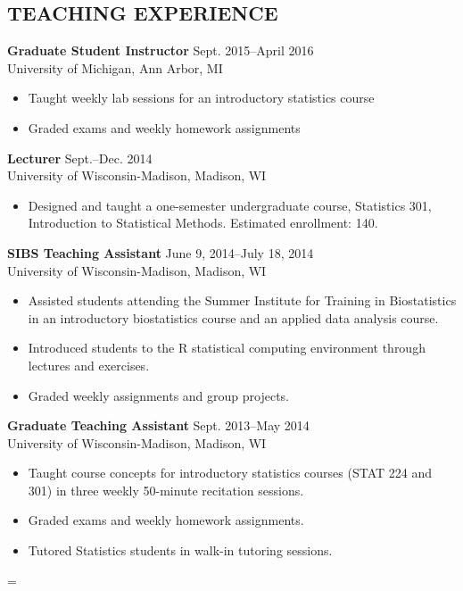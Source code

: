 \documentclass[line]{res}
\newenvironment{absolutelynopagebreak}
  {\par\nobreak\vfil\penalty0\vfilneg
   \vtop\bgroup}
  {\par\xdef\tpd{\the\prevdepth}\egroup
   \prevdepth=\tpd}
\begin{document}
\begin{resume}
\section{TEACHING EXPERIENCE}
{\bf Graduate Student Instructor} \hfill Sept. 2015--April 2016\\
University of Michigan, Ann Arbor, MI
\begin{itemize}
\item Taught weekly lab sessions for an introductory statistics course
\item Graded exams and weekly homework assignments 
\end{itemize}
{\bf Lecturer} \hfill Sept.--Dec. 2014 \\
University of Wisconsin-Madison, Madison, WI
\begin{itemize}  %
\item Designed and taught a one-semester
  undergraduate course, Statistics 301, Introduction
  to Statistical Methods. Estimated enrollment: 140. 
\end{itemize}
{\bf SIBS Teaching Assistant}  \hfill June 9,
2014--July 18, 2014\\
University of Wisconsin-Madison, Madison, WI
\begin{itemize}
\item Assisted students attending the Summer Institute for Training in
  Biostatistics in an introductory biostatistics course and an
  applied data analysis course.
\item Introduced students to the R
  statistical computing environment through
  lectures and exercises.
\item Graded weekly assignments and group
  projects.
\end{itemize}
\vspace{12pt}
\begin{absolutelynopagebreak}
{\bf Graduate Teaching Assistant} \hfill Sept. 2013--May 2014\\
University of Wisconsin-Madison, Madison, WI
\begin{itemize}
\item Taught course concepts for introductory statistics courses (STAT
  224 and 301) in
  three weekly 50-minute recitation sessions.
\item Graded exams and weekly
  homework assignments.
\item Tutored Statistics students in walk-in
  tutoring sessions.
\end{itemize}
\end{absolutelynopagebreak}

\end{resume}
\end{document}
